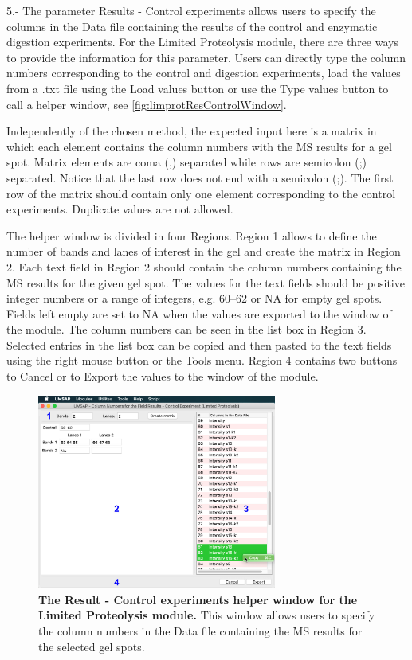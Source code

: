 \num{5}.- \label{par:limprotResultControl}The parameter Results - Control experiments allows users to specify the columns in the Data file containing the results of the control and enzymatic digestion experiments. For the Limited Proteolysis module, there are three ways to provide the information for this parameter. Users can directly type the column numbers corresponding to the control and digestion experiments, load the values from a .txt file using the Load values button or use the Type values button to call a helper window, see \autoref{fig:limprotResControlWindow}. 

Independently of the chosen method, the expected input here is a matrix in which each element contains the column numbers with the MS results for a gel spot. Matrix elements are coma (,) separated while rows are semicolon (;) separated. Notice that the last row does not end with a semicolon (;). The first row of the matrix should contain only one element corresponding to the control experiments. Duplicate values are not allowed. 

The helper window is divided in four Regions. Region \num{1} allows to define the number of bands and lanes of interest in the gel and create the matrix in Region \num{2}. Each text field in Region \num{2} should contain the column numbers containing the MS results for the given gel spot. The values for the text fields should be positive integer numbers or a range of integers, e.g. \numrange[range-phrase=--]{60}{62} or NA for empty gel spots. Fields left empty are set to NA when the values are exported to the window of the module. The column numbers can be seen in the list box in Region \num{3}. Selected entries in the list box can be copied and then pasted to the text fields using the right mouse button or the Tools menu. Region \num{4} contains two buttons to Cancel or to Export the values to the window of the module. 

\begin{figure}[h]
	\centering
	\includegraphics[width=0.7\textwidth]{./IMAGES/MOD-LIMPROT/limprot-rescontrol.jpg}
	\caption[The Result - Control experiments helper window for the Limited Proteolysis module]{\textbf{The Result - Control experiments helper window for the Limited Proteolysis module.} This window allows users to specify the column numbers in the Data file containing the MS results for the selected gel spots.} 
	\label{fig:limprotResControlWindow}
	\vspace{-5pt} 	
\end{figure}

